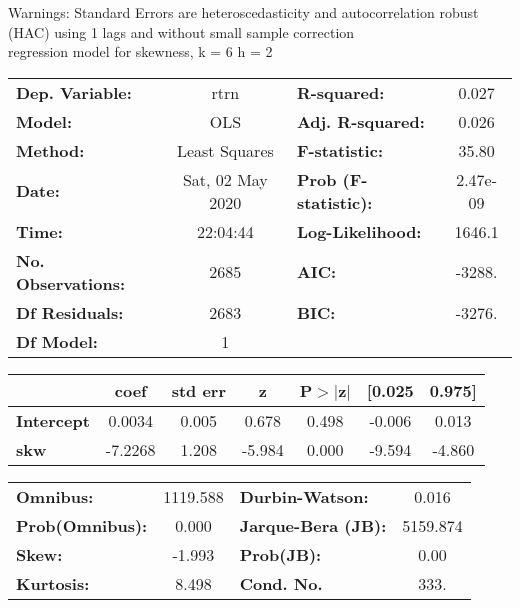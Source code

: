 Warnings: \newline
 [1] Standard Errors are heteroscedasticity and autocorrelation robust (HAC) using 1 lags and without small sample correction\\ 

regression model for skewness, k = 6 h = 2\begin{center}
\begin{tabular}{lclc}
\toprule
\textbf{Dep. Variable:}    &       rtrn       & \textbf{  R-squared:         } &     0.027   \\
\textbf{Model:}            &       OLS        & \textbf{  Adj. R-squared:    } &     0.026   \\
\textbf{Method:}           &  Least Squares   & \textbf{  F-statistic:       } &     35.80   \\
\textbf{Date:}             & Sat, 02 May 2020 & \textbf{  Prob (F-statistic):} &  2.47e-09   \\
\textbf{Time:}             &     22:04:44     & \textbf{  Log-Likelihood:    } &    1646.1   \\
\textbf{No. Observations:} &        2685      & \textbf{  AIC:               } &    -3288.   \\
\textbf{Df Residuals:}     &        2683      & \textbf{  BIC:               } &    -3276.   \\
\textbf{Df Model:}         &           1      & \textbf{                     } &             \\
\bottomrule
\end{tabular}
\begin{tabular}{lcccccc}
                   & \textbf{coef} & \textbf{std err} & \textbf{z} & \textbf{P$> |$z$|$} & \textbf{[0.025} & \textbf{0.975]}  \\
\midrule
\textbf{Intercept} &       0.0034  &        0.005     &     0.678  &         0.498        &       -0.006    &        0.013     \\
\textbf{skw}       &      -7.2268  &        1.208     &    -5.984  &         0.000        &       -9.594    &       -4.860     \\
\bottomrule
\end{tabular}
\begin{tabular}{lclc}
\textbf{Omnibus:}       & 1119.588 & \textbf{  Durbin-Watson:     } &    0.016  \\
\textbf{Prob(Omnibus):} &   0.000  & \textbf{  Jarque-Bera (JB):  } & 5159.874  \\
\textbf{Skew:}          &  -1.993  & \textbf{  Prob(JB):          } &     0.00  \\
\textbf{Kurtosis:}      &   8.498  & \textbf{  Cond. No.          } &     333.  \\
\bottomrule
\end{tabular}
\end{center}

